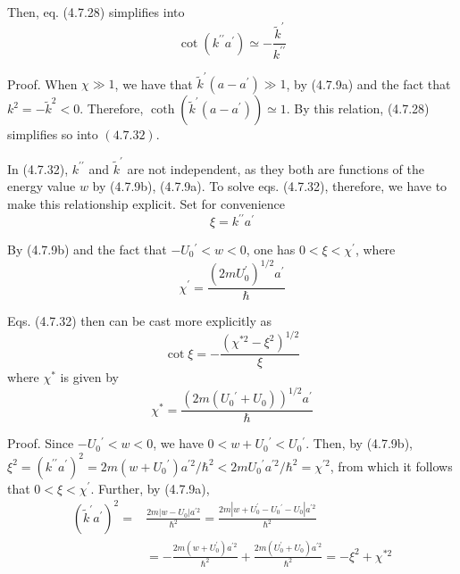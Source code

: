 \documentclass{article}
\begin{document}
Then, eq. (4.7.28) simplifies into
$$
\begin{equation*}
\cot \left(k^{\prime \prime} a^{\prime}\right) \simeq-\frac{\tilde{k}^{\prime}}{k^{\prime \prime}} \tag{4.7.32}
\end{equation*}
$$

Proof. When $\chi \gg 1$, we have that $\tilde{k}^{\prime}\left(a-a^{\prime}\right) \gg 1$, by (4.7.9a) and the fact that $k^{2}=-\tilde{k}^{2}<0$. Therefore, $\operatorname{coth}\left(\tilde{k}^{\prime}\left(a-a^{\prime}\right)\right) \simeq 1$. By this relation, (4.7.28) simplifies so into $(4.7 .32)$.

In (4.7.32), $k^{\prime \prime}$ and $\tilde{k}^{\prime}$ are not independent, as they both are functions of the energy value $w$ by (4.7.9b), (4.7.9a). To solve eqs. (4.7.32), therefore, we have to make this relationship explicit. Set for convenience
$$
\begin{equation*}
\xi=k^{\prime \prime} a^{\prime} \tag{4.7.33}
\end{equation*}
$$

By (4.7.9b) and the fact that $-U_{0}{ }^{\prime}<w<0$, one has $0<\xi<\chi^{\prime}$, where
$$
\begin{equation*}
\chi^{\prime}=\frac{\left(2 m U_{0}^{\prime}\right)^{1 / 2} a^{\prime}}{\hbar} \tag{4.7.34}
\end{equation*}
$$

Eqs. (4.7.32) then can be cast more explicitly as
$$
\begin{equation*}
\cot \xi=-\frac{\left(\chi^{* 2}-\xi^{2}\right)^{1 / 2}}{\xi} \tag{4.7.35}
\end{equation*}
$$
where $\chi^{*}$ is given by
$$
\begin{equation*}
\chi^{*}=\frac{\left(2 m\left(U_{0}{ }^{\prime}+U_{0}\right)\right)^{1 / 2} a^{\prime}}{\hbar} \tag{4.7.36}
\end{equation*}
$$

Proof. Since $-U_{0}{ }^{\prime}<w<0$, we have $0<w+U_{0}{ }^{\prime}<U_{0}{ }^{\prime}$. Then, by (4.7.9b), $\xi^{2}=\left(k^{\prime \prime} a^{\prime}\right)^{2}=2 m\left(w+U_{0}{ }^{\prime}\right) a^{\prime 2} / \hbar^{2}<2 m U_{0}{ }^{\prime} a^{\prime 2} / \hbar^{2}=\chi^{\prime 2}$, from which it follows that $0<\xi<\chi^{\prime}$. Further, by (4.7.9a),
$$
\begin{align*}
\left(\tilde{k}^{\prime} a^{\prime}\right)^{2}= & \frac{2 m\left|w-U_{0}\right| a^{\prime 2}}{\hbar^{2}}=\frac{2 m\left|w+U_{0}^{\prime}-U_{0}{ }^{\prime}-U_{0}\right| a^{\prime 2}}{\hbar^{2}}  \tag{4.7.37}\\
& =-\frac{2 m\left(w+U_{0}^{\prime}\right) a^{\prime 2}}{\hbar^{2}}+\frac{2 m\left(U_{0}^{\prime}+U_{0}\right) a^{\prime 2}}{\hbar^{2}}=-\xi^{2}+\chi^{* 2}
\end{align*}
$$
\end{document}
